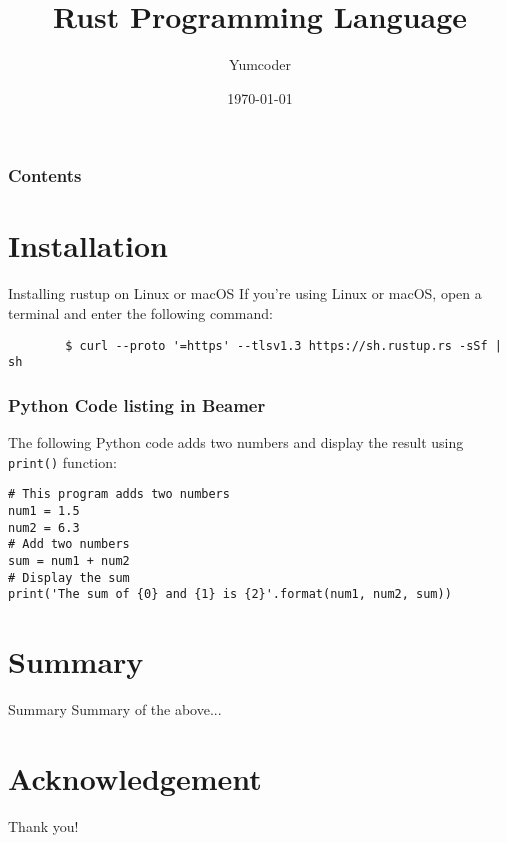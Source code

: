 \documentclass{beamer}
\title[Rust-Lang]{Rust Programming Language}
\author[Yumcoder]{Yumcoder}
\institute[UoT]{University of Toronto}
\date[{\today} ]
{\today}
\begin{document}
\frame{\titlepage}
\begin{frame}
\frametitle{Contents}
\tableofcontents
\end{frame}
\section{Installation}
\begin{frame}{Installing rustup on Linux or macOS}
	If you’re using Linux or macOS, open a terminal and enter the following command:
	\begin{verbatim}
		$ curl --proto '=https' --tlsv1.3 https://sh.rustup.rs -sSf | sh
	\end{verbatim}
\end{frame}

\begin{frame}[fragile]
	\frametitle{Python Code listing in Beamer}
	The following Python code adds two numbers and display the result using \verb|print()| function:
	\scriptsize
	\begin{verbatim}
# This program adds two numbers
num1 = 1.5
num2 = 6.3
# Add two numbers
sum = num1 + num2
# Display the sum
print('The sum of {0} and {1} is {2}'.format(num1, num2, sum))
	\end{verbatim}
\end{frame}

\section{Summary}

\begin{frame}{Summary}
Summary of the above...
\end{frame}

\section*{Acknowledgement}  
\begin{frame}
\Huge{\centerline{Thank you!}}
\end{frame}
\end{document}
